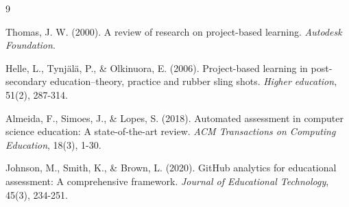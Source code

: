 \documentclass[12pt,a4paper]{article}
\begin{document}
\begin{thebibliography}{9}

Thomas, J. W. (2000). A review of research on project-based learning. \textit{Autodesk Foundation}.

Helle, L., Tynjälä, P., \& Olkinuora, E. (2006). Project-based learning in post-secondary education–theory, practice and rubber sling shots. \textit{Higher education}, 51(2), 287-314.

Almeida, F., Simoes, J., \& Lopes, S. (2018). Automated assessment in computer science education: A state-of-the-art review. \textit{ACM Transactions on Computing Education}, 18(3), 1-30.

Johnson, M., Smith, K., \& Brown, L. (2020). GitHub analytics for educational assessment: A comprehensive framework. \textit{Journal of Educational Technology}, 45(3), 234-251.

\end{thebibliography}
\end{document}
